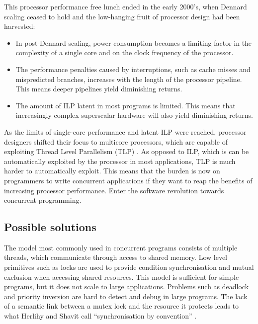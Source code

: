 \documentclass[12pt,a4paper,oneside,openright]{report}
\begin{document}
This processor performance free lunch \cite{FreeLunchIsOver} ended in
the early 2000's, when Dennard scaling ceased to hold and the
low-hanging fruit of processor design had been harvested:

\begin{itemize}
\item In post-Dennard scaling, power consumption becomes a limiting
  factor in the complexity of a single core and on the clock frequency
  of the processor.
  
\item The performance penalties caused by interruptions, such as cache
  misses and mispredicted branches, increases with the length of the
  processor pipeline. This means deeper pipelines yield diminishing
  returns.
  
\item The amount of ILP latent in most programs is limited. This means
  that increasingly complex superscalar hardware will also yield
  diminishing returns.
\end{itemize}

As the limits of single-core performance and latent ILP were reached,
processor designers shifted their focus to multicore processors, which
are capable of exploiting Thread Level Parallelism (TLP)
\cite[Chapter~5]{CompArchBook}. As opposed to ILP, which is can be
automatically exploited by the processor in most applications, TLP is
much harder to automatically exploit. This means that the burden is
now on programmers to write concurrent applications if they want to
reap the benefits of increasing processor performance. Enter the
software revolution towards concurrent programming.

\subsection{Possible solutions}
\label{sec:possible-solutions}

The model most commonly used in concurrent programs consists of
multiple threads, which communicate through access to shared
memory. Low level primitives such as locks are used to provide
condition synchronisation and mutual exclusion when accessing shared
resources. This model is sufficient for simple programs, but it does
not scale to large applications. Problems such as deadlock and
priority inversion are hard to detect and debug in large programs. The
lack of a semantic link between a mutex lock and the resource it
protects leads to what Herlihy and Shavit call ``synchronisation by
convention'' \cite[Chapter 18]{ArtMultiprocessorProgramming}.
\end{document}
